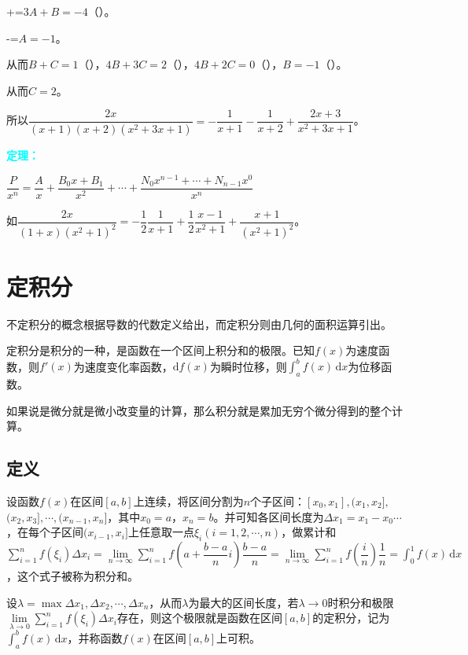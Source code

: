 \documentclass[UTF8, 12pt]{ctexart}
\begin{document}
+=$3A+B=-4$（）。

-=$A=-1$。

从而$B+C=1$（），$4B+3C=2$（），$4B+2C=0$（），$B=-1$（）。

从而$C=2$。

所以$\dfrac{2x}{(x+1)(x+2)(x^2+3x+1)}=-\dfrac{1}{x+1}-\dfrac{1}{x+2}+\dfrac{2x+3}{x^2+3x+1}$。\medskip

\textcolor{aqua}{\textbf{定理：}}

$\dfrac{P}{x^n}=\dfrac{A}{x}+\dfrac{B_0x+B_1}{x^2}+\cdots+\dfrac{N_0x^{n-1}+\cdots+N_{n-1}x^0}{x^n}$ \medskip

如$\dfrac{2x}{(1+x)(x^2+1)^2}=-\dfrac{1}{2}\dfrac{1}{x+1}+\dfrac{1}{2}\dfrac{x-1}{x^2+1}+\dfrac{x+1}{(x^2+1)^2}$。

\section{定积分}

不定积分的概念根据导数的代数定义给出，而定积分则由几何的面积运算引出。

定积分是积分的一种，是函数在一个区间上积分和的极限。已知$f(x)$为速度函数，则$f'(x)$为速度变化率函数，$\textrm{d}f(x)$为瞬时位移，则$\int_{a}^bf(x)\,\textrm{d}x$为位移函数。

如果说是微分就是微小改变量的计算，那么积分就是累加无穷个微分得到的整个计算。

\subsection{定义}

设函数$f(x)$在区间$[a,b]$上连续，将区间分割为$n$个子区间：$[x_0,x_1],(x_1,x_2],$\\$(x_2,x_3],\cdots,(x_{n-1},x_n]$，其中$x_0=a$，$x_n=b$。并可知各区间长度为$\Delta x_1=x_1-x_0\cdots$，在每个子区间$(x_{i-1},x_i]$上任意取一点$\xi_i(i=1,2,\cdots,n)$，做累计和$\sum\limits_{i=1}^nf(\xi_i)\Delta x_i=\lim\limits_{n\to\infty}\sum\limits_{i=1}^nf(a+\dfrac{b-a}{n}i)\dfrac{b-a}{n}=\lim\limits_{n\to\infty}\sum\limits_{i=1}^nf(\dfrac{i}{n})\dfrac{1}{n}=\int_0^1f(x)\,\textrm{d}x$，这个式子被称为积分和。

设$\lambda=\max{\Delta x_1,\Delta x_2,\cdots,\Delta x_n}$，从而$\lambda$为最大的区间长度，若$\lambda\to 0$时积分和极限$\lim\limits_{\lambda\to 0}\sum\limits_{i=1}^nf(\xi_i)\Delta x_i$存在，则这个极限就是函数在区间$[a,b]$的定积分，记为$\int_a^bf(x)\,\textrm{d}x$，并称函数$f(x)$在区间$[a,b]$上可积。
\end{document}
